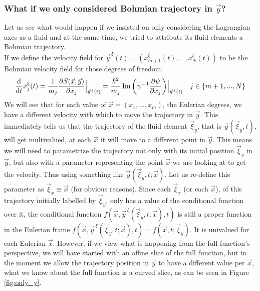 \documentclass[11pt, a4paper]{article} %
\DeclareRobustCommand{\mybox}[2][gray!10]{%
\begin{tcolorbox}[   %
        left=0.2cm,
        right=0.2cm,
        top=0.15cm,
        bottom=0.15cm,
        colback=#1,
        colframe=#1,
        width=\dimexpr\textwidth\relax, 
        enlarge left by=0mm,
        boxsep=5pt,
        arc=0pt,outer arc=0pt,
        ]
        #2
\end{tcolorbox}
}
\begin{document}
\mybox{
\subsubsection*{What if we only considered Bohmian trajectory in $\vec{y}$?}

Let us see what would happen if we insisted on only considering the Lagrangian axes as a fluid and at the same time, we tried to attribute its fluid elements a Bohmian trajectory.\\

If we define the velocity field for $\vec{y}^{\, \xi}(t)=(x_{m+1}^\xi(t), ...,x_N^\xi(t))$ to be the Bohmian velocity field for those degrees of freedom:
\begin{equation}
\dv{}{t}x_j^\xi(t)=\frac{1}{m_j}\pdv{S(\vec{x}, \vec{y})}{x_j}\Big\rvert_{\vec{y}^{\, \xi}(t)}=\frac{\hbar^2}{m_j}\Im\qty( \psi^{-1} \pdv{\psi}{x_j})\Big\rvert_{\vec{y}^{\, \xi}(t)} \quad j\in\{m+1,...,N\}
\end{equation}
We will see that for each value of $\vec{x}=(x_1,...,x_m)$, the Eulerian degrees, we have a different velocity with which to move the trajectory in $\vec{y}$. This immediately tells us that the trajectory of the fluid element $\vec{\xi}_y$, that is $\vec{y}(\vec{\xi}_y,t)$, will get multivalued, at each $\vec{x}$ it will move to a different point in $\vec{y}$. This means we will need to parametrize the trajectory not only with its initial position $\vec{\xi}_y$ in $\vec{y}$, but also with a parameter representing the point $\vec{x}$ we are looking at to get the velocity. Thus using something like $\vec{y}(\vec{\xi}_y,t; \vec{x})$. Let us re-define this parameter as $\vec{\xi}_x\equiv \vec{x}$ (for obvious reasons). Since each $\vec{\xi}_x$ (or each $\vec{x}$), of this trajectory initially labelled by $\vec{\xi}_y$, only has a value of the conditional function over it, the conditional function $f(\vec{x},\vec{y}^{\, \xi}(\vec{\xi}_y,t; \vec{x}),t)$ is still a proper function in the Eulerian frame $f(\vec{x},\vec{y}^{\, \xi}(\vec{\xi}_y,t; \vec{x}),t)=f(\vec{x},t; \vec{\xi}_y)$. It is univalued for each Eulerian $\vec{x}$. However, if we view what is happening from the full function's perspective, we will have started with an affine slice of the full function, but in the moment we allow the trajectory position in $\vec{y}$ to have a different value per $\vec{x}$, what we know about the full function is a curved slice, as can be seen in Figure \ref{fig:only_y}.

}
\end{document}
